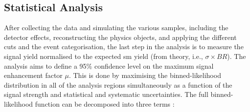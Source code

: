 
\subsection{Statistical Analysis}\label{sec-fitFramework}
After collecting the data and simulating the various samples, including the detector effects, reconstructing the physics objects, and applying the different cuts and the event categorisation, the last step in the analysis is to measure the signal yield normalised to the expected \gls{sm} yield (from theory, i.e., $\sigma \times BR$). The analysis aims to define a 95\% confidence level on the maximum signal enhancement factor $\mu$. This is done by maximising the binned-likelihood distribution in all of the analysis regions simultaneously as a function of the signal strength and statistical and systematic uncertainties. The full binned-likelihood function can be decomposed into three terms \cite{Mironova:2837159}: 
